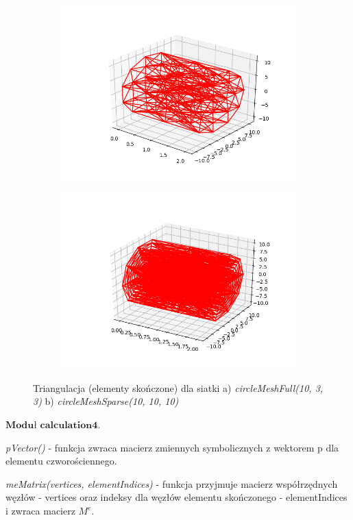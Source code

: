\begin{figure}
\begin{subfigure}{.5\textwidth}
  \centering
  \includegraphics[width=.8\linewidth]{Zdjecia/5/triangulation1}
  \caption{}
  \label{fig:sfig1}
\end{subfigure}%
\begin{subfigure}{.5\textwidth}
  \centering
  \includegraphics[width=.8\linewidth]{Zdjecia/5/triangulation2}
  \caption{}
  \label{fig:sfig2}
\end{subfigure}

\caption{Triangulacja (elementy skończone) dla siatki a) \textit{circleMeshFull(10, 3, 3)} b) \textit{circleMeshSparse(10, 10, 10)}}
\label{fig:triangulation}
\end{figure}

 \( \textbf{Moduł calculation4} \).

\textit{pVector()} - funkcja zwraca macierz zmiennych symbolicznych z wektorem p dla elementu czworościennego.

\textit{meMatrix(vertices, elementIndices)} - funkcja przyjmuje macierz współrzędnych węzłów - vertices oraz indeksy dla węzłów elementu skończonego - elementIndices i zwraca macierz \( M^e \).

